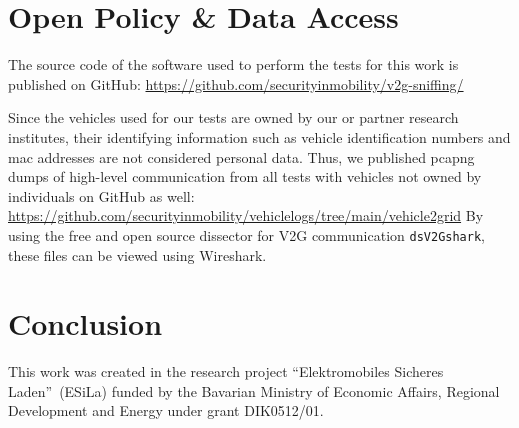 \documentclass[sigconf]{acmart}
\begin{document}

\section{Open Policy \& Data Access}
The source code of the software used to perform the tests for this work is published on GitHub: \url{https://github.com/securityinmobility/v2g-sniffing/}

Since the vehicles used for our tests are owned by our or partner research institutes, their identifying information such as vehicle identification numbers and mac addresses are not considered personal data.
Thus, we published pcapng dumps of high-level communication from all tests with vehicles not owned by individuals on GitHub as well: \url{https://github.com/securityinmobility/vehiclelogs/tree/main/vehicle2grid}
By using the free and open source dissector for V2G communication \texttt{dsV2Gshark}\cite{dspace_dsv2gshark_nodate}, these files can be viewed using Wireshark\cite{wireshark_wireshark_nodate}.

\section{Conclusion}

\begin{acks}
This work was created in the research project \textquotedblleft Elektromobiles Sicheres Laden\textquotedblright\ (ESiLa) funded by the Bavarian Ministry of Economic Affairs, Regional Development and Energy under grant DIK0512/01.
\end{acks}
\end{document}
